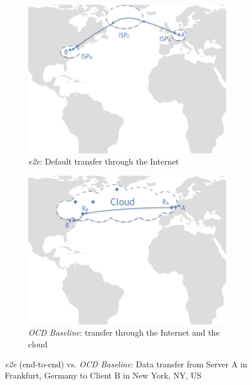 \documentclass[newfonts=false,format=sigconf,anonymous,10pt,letterpaper]{acmart}
\providecommand{\vs}{vs. }
\begin{document}
\begin{figure}[t]
  \centering
  \begin{subfigure}{.49\textwidth}
  \centering
    \includegraphics[width=0.98\textwidth,clip=true, trim = 0 115mm 0 0]{figures/overlay-vs-e2e002.png}
    \caption{\textit{e2e}: Default  transfer through the Internet}
    \label{fig:e2e-traffic}
\end{subfigure}
\begin{subfigure}{.49\textwidth}
  \centering
    \includegraphics[width=0.98\textwidth, clip, trim = 0 115mm 0 0]{figures/overlay-vs-e2e001.png}
    \caption{\textit{OCD Baseline}: transfer through the Internet and the cloud}
    \label{fig:cloud-traffic}
\end{subfigure}
\caption{\textit{e2e} (end-to-end) \vs \textit{OCD Baseline}: Data transfer from Server A in Frankfurt, Germany to Client B in New York, NY, US 
}
\label{fig:e2e-vs-cloud-traffic}
\end{figure}
\end{document}
